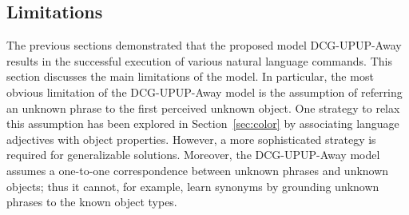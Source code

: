 \subsection{Limitations}
The previous sections demonstrated that the proposed model DCG-UPUP-Away results in the successful execution of various natural language commands. This section discusses the main limitations of the model.
In particular, the most obvious limitation of the DCG-UPUP-Away model is the assumption of referring an unknown phrase to the first perceived unknown object. %
One strategy to relax this assumption has been explored in Section~\ref{sec:color} by associating language adjectives with object properties. However, a more sophisticated strategy is required for generalizable solutions.  %
Moreover, the DCG-UPUP-Away model assumes a one-to-one correspondence between unknown phrases and unknown objects; thus it cannot, for example, learn synonyms by grounding unknown phrases to the known object types.